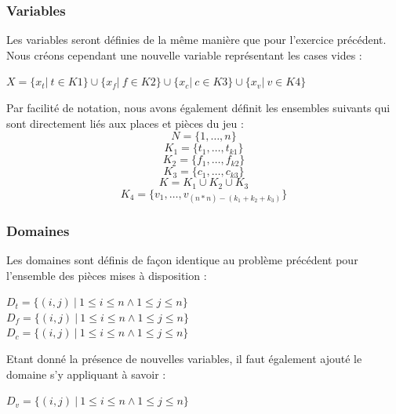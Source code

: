 \documentclass[a4paper]{article}
\begin{document}
\subsubsection{Variables}
Les variables seront définies de la même manière que pour l'exercice précédent. Nous créons cependant une nouvelle variable représentant les cases vides : 
\begin{center}
$X = \{ x_t | \ t \in K1 \}  \cup \{ x_f | \ f \in K2 \} \cup \{ x_c | \ c \in K3 \} \cup \{ x_v | \ v \in K4 \}$
\end{center}
Par facilité de notation, nous avons également définit les ensembles suivants qui sont directement liés aux places et pièces du jeu : 
\begin{equation*}
N = \{1,\ldots,n\}
\end{equation*}
\begin{equation*}
K_1 = \{ t_1,\ldots,t_{k1} \}
\end{equation*}
\begin{equation*}
K_2 = \{ f_1,\ldots,f_{k2} \}
\end{equation*}
\begin{equation*}
K_3 = \{ c_1,\ldots,c_{k3} \}
\end{equation*}
\begin{equation*}
K = K_1 \cup K_2 \cup K_3
\end{equation*}
\begin{equation*}
K_4 = \{ v_1,\ldots,v_{(n*n)-(k_1+k_2+k_3)} \}
\end{equation*}

\subsubsection{Domaines}
Les domaines sont définis de façon identique au problème précédent pour l'ensemble des pièces mises à disposition : 
\begin{center}
$D_t = \{ (i,j) \ | \ 1 \leq i \leq n \wedge 1 \leq j \leq n \}$ \\
$D_f = \{ (i,j) \ | \ 1 \leq i \leq n \wedge 1 \leq j \leq n \}$ \\
$D_c = \{ (i,j) \ | \ 1 \leq i \leq n \wedge 1 \leq j \leq n \}$ \\
\end{center}
Etant donné la présence de nouvelles variables, il faut également ajouté le domaine s'y appliquant à savoir : 
\begin{center}
$D_v = \{ (i,j) \ | \ 1 \leq i \leq n \wedge 1 \leq j \leq n \}$
\end{center}
\end{document}
